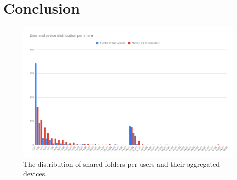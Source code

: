 \section{Conclusion}
\begin{figure}[!t]
\centering
    \includegraphics[width=1.0\linewidth]{img/share_distribution_bdirve.png}
    \caption{The distribution of shared folders per users and their aggregated devices.}
    \label{fig:evaluation-share-distribution}
\end{figure}
